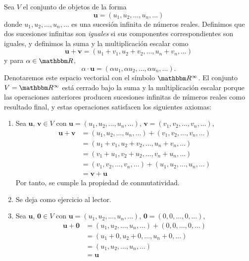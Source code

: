 \begin{examplebox}{}{}
    Sea $V$ el conjunto de objetos de la forma
    $$\mathbf{u} = (u_1, u_2, \dots, u_n, \dots)$$
    donde $u_1, u_2, \dots, u_n, \dots$ es una sucesión infinita de números reales. Definimos que dos sucesiones infinitas son \emph{iguales} si sus componentes correspondientes son iguales, y definimos la suma y la multiplicación escalar como
    $$\mathbf{u} + \mathbf{v} = (u_1 + v_1, u_2 + v_2, \dots, u_n + v_n, \dots)$$
    y para $\alpha \in \RR$,
    $$\alpha \cdot \mathbf{u} = (\alpha u_1, \alpha u_2, \dots, \alpha u_n, \dots).$$
    Denotaremos este espacio vectorial con el símbolo $\RR[\infty]$. El conjunto $V = \RR[\infty]$ está cerrado bajo la suma y la multiplicación escalar porque las operaciones anteriores producen sucesiones infinitas de números reales como resultado final, y estas operaciones satisfacen los siguientes axiomas:
    \begin{enumerate}[label=\roman*), topsep=6pt, itemsep=0pt]
        \item Sea $\mathbf{u}$, $\mathbf{v} \in V$ con $\mathbf{u} = (u_1, u_2, \dots, u_n, \dots)$, $\mathbf{v} = (v_1, v_2, \dots, v_n, \dots)$,
        \begin{align*}
            \mathbf{u} + \mathbf{v} & = (u_1, u_2, \dots, u_n, \dots) + (v_1, v_2, \dots, v_n, \dots) \\
            & = (u_1 + v_1, u_2 + v_2, \dots, u_n + v_n, \dots) \\
            & = (v_1 + u_1, v_2 + u_2, \dots, v_n + u_n, \dots) \\
            & = (v_1, v_2, \dots, v_n, \dots) + (u_1, u_2, \dots, u_n, \dots) \\
            & = \mathbf{v} + \mathbf{u}
        \end{align*}
        Por tanto, se cumple la propiedad de conmutatividad.
        \item Se deja como ejercicio al lector.
        \item Sea $\mathbf{u}$, $\mathbf{0} \in V$ con $\mathbf{u} = (u_1, u_2, \dots, u_n, \dots)$, $\mathbf{0} = (0, 0, \dots, 0, \dots)$,
        \begin{align*}
            \mathbf{u} + \mathbf{0} & = (u_1, u_2, \dots, u_n, \dots) + (0, 0, \dots, 0, \dots) \\
            & = (u_1 + 0, u_2 + 0, \dots, u_n + 0, \dots) \\
            & = (u_1, u_2, \dots, u_n, \dots) \\
            & = \mathbf{u}
        \end{align*}

\end{enumerate}
\end{examplebox}
